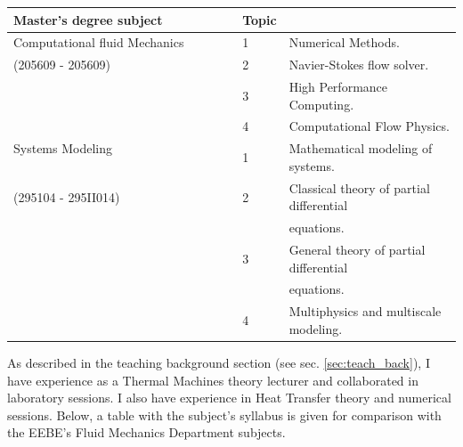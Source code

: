 \documentclass{article}
\begin{document}
\begin{tabular}{l l l }
{\bf Master's degree subject}       &  {\bf Topic}  & $\ $                                                 \\ 
\hline
Computational fluid Mechanics  & 1  &  Numerical Methods.                                  \\ 
(205609 - 205609)   & 2             &  Navier-Stokes flow solver.                          \\
$\ $                & 3             &  High Performance Computing.                         \\
$\ $                & 4             &  Computational Flow Physics.                         \\     
\hline
Systems Modeling  $\quad\quad\quad\quad\quad\quad\quad\quad\quad\quad\quad\quad\quad\ \ $ & 1  &  Mathematical modeling of systems.                    \\ 
(295104 - 295II014) & 2             &  Classical theory of partial differential  $\quad\quad\quad\ $          \\
$\ $                  &   $\ $      &  equations.                                          \\
$\ $                & 3             &  General theory of partial differential              \\
$\ $                  &   $\ $      &  equations.                                          \\
$\ $                & 4             &  Multiphysics and multiscale modeling.               \\

\hline
\end{tabular}

As described in the teaching background section (see sec. \ref{sec:teach_back}), I have experience as a Thermal Machines theory lecturer and collaborated in laboratory sessions. I also have experience in Heat Transfer theory and numerical sessions. Below, a table with the subject's syllabus is given for comparison with the EEBE's Fluid Mechanics Department subjects.
\end{document}
